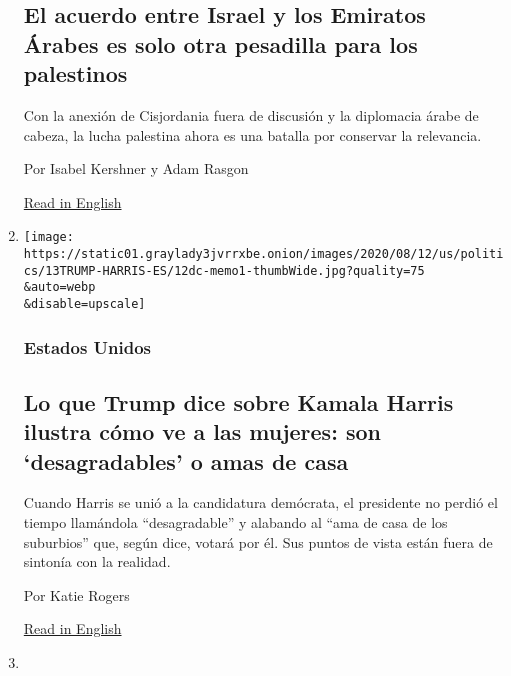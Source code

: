 \begin{enumerate}
  \hypertarget{el-acuerdo-entre-israel-y-los-emiratos-uxe1rabes-es-solo-otra-pesadilla-para-los-palestinos}{%
  \subsection{El acuerdo entre Israel y los Emiratos Árabes es solo otra
  pesadilla para los
  palestinos}\label{el-acuerdo-entre-israel-y-los-emiratos-uxe1rabes-es-solo-otra-pesadilla-para-los-palestinos}}

  Con la anexión de Cisjordania fuera de discusión y la diplomacia árabe
  de cabeza, la lucha palestina ahora es una batalla por conservar la
  relevancia.

  Por Isabel Kershner y Adam Rasgon

  \href{https://www.nytimes3xbfgragh.onion/2020/08/14/world/middleeast/palestinians-israel-uae-annexation-peace.html}{Read
  in English}
\item
  \href{/es/2020/08/14/espanol/mundo/trump-kamala-harris.html}{}

  \texttt{[image: https://static01.graylady3jvrrxbe.onion/images/2020/08/12/us/politics/13TRUMP-HARRIS-ES/12dc-memo1-thumbWide.jpg?quality=75\\\&auto=webp\\\&disable=upscale]}

  \hypertarget{estados-unidos}{%
  \subsubsection{Estados Unidos}\label{estados-unidos}}

  \hypertarget{lo-que-trump-dice-sobre-kamala-harris-ilustra-cuxf3mo-ve-a-las-mujeres-son-desagradables-o-amas-de-casa}{%
  \subsection{Lo que Trump dice sobre Kamala Harris ilustra cómo ve a
  las mujeres: son `desagradables' o amas de
  casa}\label{lo-que-trump-dice-sobre-kamala-harris-ilustra-cuxf3mo-ve-a-las-mujeres-son-desagradables-o-amas-de-casa}}

  Cuando Harris se unió a la candidatura demócrata, el presidente no
  perdió el tiempo llamándola ``desagradable'' y alabando al ``ama de
  casa de los suburbios'' que, según dice, votará por él. Sus puntos de
  vista están fuera de sintonía con la realidad.

  Por Katie Rogers

  \href{https://www.nytimes3xbfgragh.onion/2020/08/12/us/politics/trump-women-kamala-harris.html}{Read
  in English}
\item
  \href{/es/2020/08/13/espanol/mundo/protestas-bielorrusia.html}{}


\end{enumerate}
